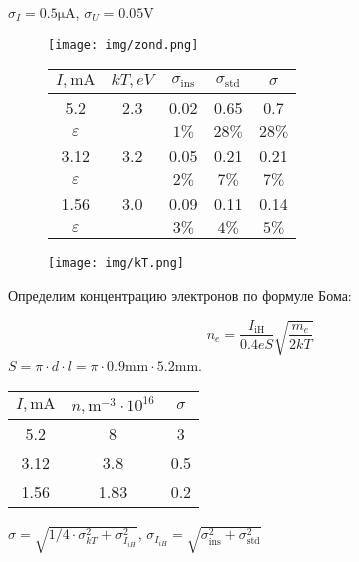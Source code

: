 \documentclass[12pt]{article}
\begin{document}
\begin{enumerate}
    $\sigma_I = 0.5 \si{\micro\ampere}$, $\sigma_U = 0.05 \si{\volt}$
    
    \newpage
	
	\begin{figure}[!htbp]
	    \centering
	    \texttt{[image: img/zond.png]}
	    \label{fig:zond}
	\end{figure}
	\begin{figure}[!htbp]
	\begin{minipage}[c]{0.45\textwidth}
	    \begin{tabular}{|c|c|c|c|c|}
    	\hline
    	     $I, \si{\milli\ampere}$ & $kT, eV$ & $\sigma_{\text{ins}}$ & $\sigma_{\text{std}}$ & $\sigma$ \\ \hline
    	     5.2 & 2.3 & 0.02 & 0.65 & 0.7 \\ \hline
    	     $\varepsilon$ &  & $1\%$ & $28\%$ & $28\%$ \\ \hline
    	     3.12 & 3.2 & 0.05 & 0.21 & 0.21 \\ \hline
    	     $\varepsilon$ &  & $2\%$ & $7\%$ & $7\%$ \\ \hline
    	     1.56 & 3.0 & 0.09 & 0.11 & 0.14 \\ \hline
    	     $\varepsilon$ &  & $3\%$ & $4\%$ & $5\%$ \\ \hline
    	\end{tabular}
	\end{minipage}
	\begin{minipage}[c]{0.45\textwidth}
	\texttt{[image: img/kT.png]}
	\end{minipage}
	\end{figure}
	
	\newpage
	
	Определим концентрацию электронов по формуле Бома:
	
	\begin{equation}
	    n_e = \dfrac{I_{\text{iH}}}{0.4 e S} \sqrt{\dfrac{m_e}{2kT}}
	\end{equation}
	$S = \pi \cdot d \cdot l = \pi \cdot 0.9 \si{\milli \metre} \cdot 5.2 \si{\milli \metre}$.
	
	\begin{tabular}{|c|c|c|}
	\hline
	     $I, \si{\milli\ampere}$ & $n, \si{\metre}^{-3} \cdot 10^{16}$ & $\sigma$ \\ \hline
	     5.2 & 8 & 3 \\ \hline
	     3.12 & 3.8 & 0.5 \\ \hline
	     1.56 & 1.83 & 0.2 \\ \hline
	\end{tabular}
	$\sigma = \sqrt{1/4 \cdot \sigma_{k T}^2 + \sigma_{I_{iH}}^2}$, $\sigma_{I_{iH}} = \sqrt{\sigma_{\text{ins}}^2 + \sigma_{\text{std}}^2}$
	

\end{enumerate}
\end{document}
